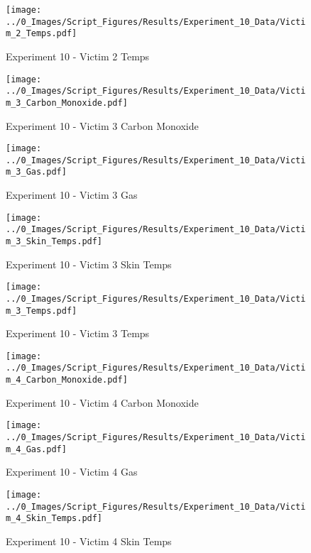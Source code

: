 	\clearpage

	\begin{figure}[H]
		\centering
		\texttt{[image: ../0\_Images/Script\_Figures/Results/Experiment\_10\_Data/Victim\_2\_Temps.pdf]}
		\caption[]{Experiment 10 - Victim 2 Temps}
	\end{figure}
 

	\begin{figure}[H]
		\centering
		\texttt{[image: ../0\_Images/Script\_Figures/Results/Experiment\_10\_Data/Victim\_3\_Carbon\_Monoxide.pdf]}
		\caption[]{Experiment 10 - Victim 3 Carbon Monoxide}
	\end{figure}
 
	\clearpage

	\begin{figure}[H]
		\centering
		\texttt{[image: ../0\_Images/Script\_Figures/Results/Experiment\_10\_Data/Victim\_3\_Gas.pdf]}
		\caption[]{Experiment 10 - Victim 3 Gas}
	\end{figure}
 

	\begin{figure}[H]
		\centering
		\texttt{[image: ../0\_Images/Script\_Figures/Results/Experiment\_10\_Data/Victim\_3\_Skin\_Temps.pdf]}
		\caption[]{Experiment 10 - Victim 3 Skin Temps}
	\end{figure}
 
	\clearpage

	\begin{figure}[H]
		\centering
		\texttt{[image: ../0\_Images/Script\_Figures/Results/Experiment\_10\_Data/Victim\_3\_Temps.pdf]}
		\caption[]{Experiment 10 - Victim 3 Temps}
	\end{figure}
 

	\begin{figure}[H]
		\centering
		\texttt{[image: ../0\_Images/Script\_Figures/Results/Experiment\_10\_Data/Victim\_4\_Carbon\_Monoxide.pdf]}
		\caption[]{Experiment 10 - Victim 4 Carbon Monoxide}
	\end{figure}
 
	\clearpage

	\begin{figure}[H]
		\centering
		\texttt{[image: ../0\_Images/Script\_Figures/Results/Experiment\_10\_Data/Victim\_4\_Gas.pdf]}
		\caption[]{Experiment 10 - Victim 4 Gas}
	\end{figure}
 

	\begin{figure}[H]
		\centering
		\texttt{[image: ../0\_Images/Script\_Figures/Results/Experiment\_10\_Data/Victim\_4\_Skin\_Temps.pdf]}
		\caption[]{Experiment 10 - Victim 4 Skin Temps}
	\end{figure}
 
